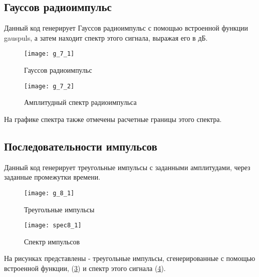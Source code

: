 \subsection{Гауссов радиоимпульс}


\parindent=1cm
Данный код генерирует Гауссов радиоимпульс с помощью встроенной функции gauspuls, а затем находит спектр этого сигнала, выражая его в дБ.

\begin{figure}[H]
	\begin{center}
		\texttt{[image: g\_7\_1]}
		\caption{Гауссов радиоимпульс} 
		\label{pic:g_7_1} %
	\end{center}
\end{figure}
\begin{figure}[H]
	\begin{center}
		\texttt{[image: g\_7\_2]}
		\caption{Амплитудный спектр радиоимпульса} 
		\label{pic:g_7_2} %
	\end{center}
\end{figure}
На графике спектра также отмечены расчетные границы этого спектра.

\subsection{Последовательности импульсов}


\parindent=1cm
Данный код генерирует треугольные импульсы с заданными амплитудами, через заданные промежутки времени.

\begin{figure}[H]
	\begin{center}
		\texttt{[image: g\_8\_1]}
		\caption{Треугольные импульсы} 
		\label{pic:g_8_1} %
	\end{center}
\end{figure}
\begin{figure}[H]
	\begin{center}
		\texttt{[image: spec8\_1]}
		\caption{Спектр импульсов} 
		\label{pic:spec8_1} %
	\end{center}
\end{figure}
На рисунках представлены - треугольные импульсы, сгенерированные с помощью встроенной функции, (\ref{pic:g_8_1}) и спектр этого сигнала (\ref{pic:spec8_1}).

